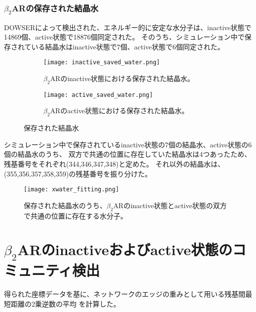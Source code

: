 \subsubsection{$\beta_2$ARの保存された結晶水}
DOWSERによって検出された、エネルギー的に安定な水分子は、inactive状態で14869個、active状態で18876個同定された。
そのうち、シミュレーション中で保存されている結晶水はinactive状態で7個、active状態で6個同定された。

\begin{figure}[htbp]
    \centering
    \begin{subfigure}{0.48\textwidth} %
      \centering
      \texttt{[image: inactive\_saved\_water.png]}
      \caption{$\beta_2$ARのinactive状態における保存された結晶水。}
      \label{fig:inactive_water}
    \end{subfigure}
    \hspace{0.02\textwidth} %
    \begin{subfigure}{0.48\textwidth}
      \centering
      \texttt{[image: active\_saved\_water.png]}
      \caption{$\beta_2$ARのactive状態における保存された結晶水。}
      \label{fig:active_water}
    \end{subfigure}
    \caption{保存された結晶水}
    \label{fig:water-all}
  \end{figure}

\newpage

シミュレーション中で保存されているinactive状態の7個の結晶水、active状態の6個の結晶水のうち、
双方で共通の位置に存在していた結晶水は4つあったため、残基番号をそれぞれ(344,346,347,348)と定めた。
それ以外の結晶水は、(355,356,357,358,359)の残基番号を振り分けた。

\begin{figure}[htbp]
  \centering
  \texttt{[image: xwater\_fitting.png]}
  \caption{保存された結晶水のうち、$\beta_2$ARのinactive状態とactive状態の双方で共通の位置に存在する水分子。}
  \label{fig:xwater_fitting}
\end{figure}

\newpage


\section{$\beta_2$ARのinactiveおよびactive状態のコミュニティ検出}

得られた座標データを基に、ネットワークのエッジの重みとして用いる残基間最短距離の2乗逆数の平均\langle {} \rangle を計算した。

